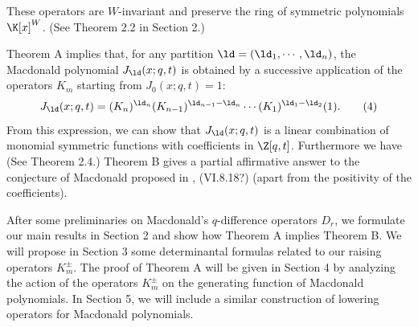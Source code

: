 These operators are $W$-invariant and preserve the ring of symmetric 
polynomials
$\K[x]^W$.
%
\noindent
(See Theorem 2.2 in Section 2.) 
%
\par
Theorem A implies that, 
for any partition $\ld=(\ld_1,\cdots,\ld_n)$, 
the Macdonald polynomial $J_\ld(x;q,t)$ 
is obtained by a successive application of the operators $K_m$ starting 
from $J_{0}(x;q,t)=1$:
$$
J_{\ld}(x;q,t)=(K_n)^{\ld_n}(K_{n-1})^{\ld_{n-1}-\ld_n}\cdots
(K_1)^{\ld_1-\ld_2}(1).  
\tag{4}
$$
{}From this expression, we can show that $J_{\ld}(x;q,t)$ is a linear 
combination 
of monomial symmetric functions with coefficients in $\Z[q,t]$.  
Furthermore we have 
\noindent
(See Theorem 2.4.)  
Theorem B gives a partial affirmative answer 
to the conjecture of Macdonald proposed in 
\cite{Ma}, (VI.8.18?) (apart from the positivity of the coefficients). 
%
\par\medpagebreak
After some preliminaries on Macdonald's $q$-difference operators 
$D_r$,  we formulate our main results in Section 2 and show how 
Theorem A implies Theorem B. 
We will propose in Section 3 some determinantal formulas related 
to our raising operators $K^\pm_m$.  
The proof of Theorem A will be given in Section 4 by analyzing the action 
of the operators $K^\pm_m$ on the generating function of Macdonald polynomials. 
In Section 5, we will include a similar construction of lowering operators
for Macdonald polynomials. 
\par\medpagebreak
